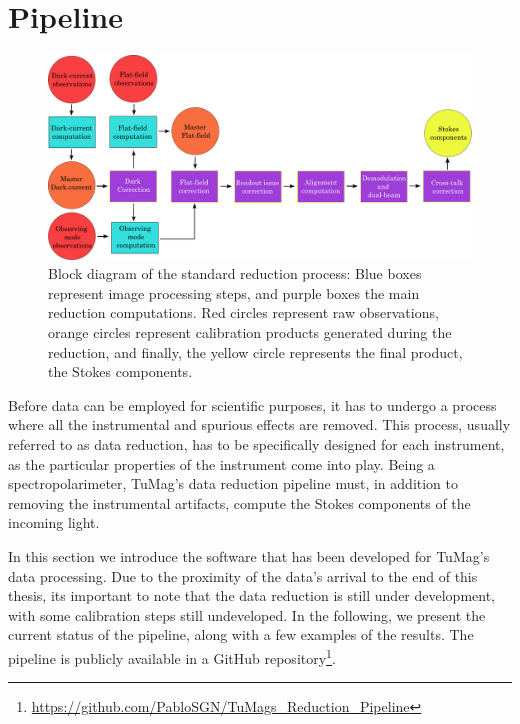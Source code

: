 \section{Pipeline}

\begin{figure}[t]
  \includegraphics[width=\textwidth]{figures/Pipeline/pipeline_diagram.pdf}
  \caption[Reduction pipeline block diagram.]{
    Block diagram of the standard reduction process: Blue boxes represent image processing steps, and purple boxes the main reduction computations. Red circles represent raw observations, orange circles represent calibration products generated during the reduction, and finally, the yellow circle represents the final product, the Stokes components. }
    \label{fig_pipeline: block_diagram}
\end{figure}

Before data can be employed for scientific purposes, it has to undergo a process where all the instrumental and spurious effects are removed. This process, usually referred to as data reduction, has to be specifically designed for each instrument, as the particular properties of the instrument come into play. Being a spectropolarimeter, TuMag's data reduction pipeline must, in addition to removing the instrumental artifacts, compute the Stokes components of the incoming light.

In this section we introduce the software that has been developed for TuMag's data processing. Due to the proximity of the data's arrival to the end of this thesis, its important to note that the data reduction is still under development, with some calibration steps still undeveloped. In the following, we present the current status of the pipeline, along with a few examples of the results. The pipeline is publicly available in a GitHub repository\footnote{\url{https://github.com/PabloSGN/TuMags_Reduction_Pipeline}}.  

